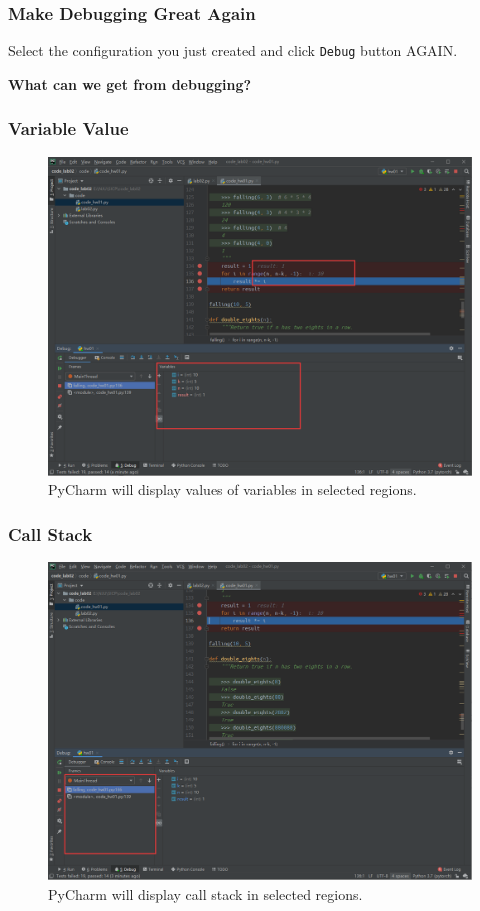 \documentclass[aspectratio=169]{beamer}
\begin{document}
\begin{frame}
\frametitle{Make Debugging Great Again}
Select the configuration you just created and click \texttt{Debug} button AGAIN.
\vfill
\begin{center}
    \textbf{What can we get from debugging?}
    \vspace{5mm}
\end{center}
\end{frame}
\begin{frame}
\frametitle{Variable Value}
\begin{figure}
    \centering
    \includegraphics[width=0.45\linewidth]{./imgs/var_value.png}
    \caption{PyCharm will display values of variables in selected regions.}
    \label{fig:breakpoint}
\end{figure}
\vspace{-5mm}
\end{frame}

\begin{frame}
\frametitle{Call Stack}
\begin{figure}
    \centering
    \includegraphics[width=0.5\linewidth]{./imgs/call_stack.png}
    \caption{PyCharm will display call stack in selected regions.}
    \label{fig:breakpoint}
\end{figure}
\vspace{-5mm}
\end{frame}
\end{document}
